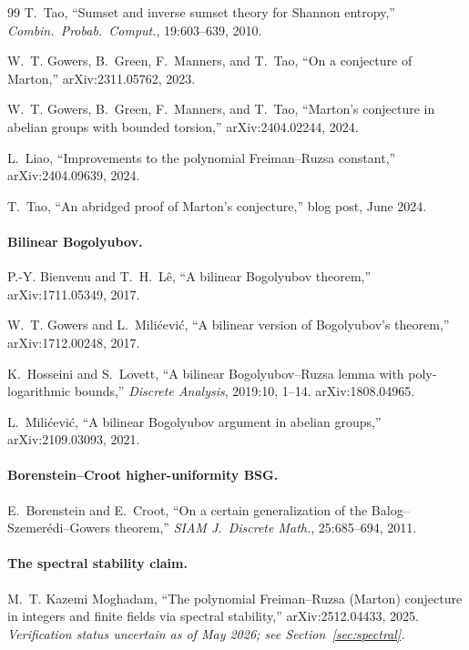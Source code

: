 \documentclass[11pt,a4paper]{article}
\theoremstyle{plain}
\theoremstyle{definition}
\theoremstyle{remark}
\begin{document}
\begin{thebibliography}{99}
T.~Tao, ``Sumset and inverse sumset theory for Shannon entropy,'' \emph{Combin.\ Probab.\ Comput.}, 19:603--639, 2010.

W.~T. Gowers, B.~Green, F.~Manners, and T.~Tao, ``On a conjecture of Marton,'' arXiv:2311.05762, 2023.

W.~T. Gowers, B.~Green, F.~Manners, and T.~Tao, ``Marton's conjecture in abelian groups with bounded torsion,'' arXiv:2404.02244, 2024.

L.~Liao, ``Improvements to the polynomial Freiman--Ruzsa constant,'' arXiv:2404.09639, 2024.

T.~Tao, ``An abridged proof of Marton's conjecture,'' blog post, June 2024.

\paragraph{Bilinear Bogolyubov.}

P.-Y. Bienvenu and T.~H.~L\^e, ``A bilinear Bogolyubov theorem,'' arXiv:1711.05349, 2017.

W.~T. Gowers and L.~Mili\'cevi\'c, ``A bilinear version of Bogolyubov's theorem,'' arXiv:1712.00248, 2017.

K.~Hosseini and S.~Lovett, ``A bilinear Bogolyubov--Ruzsa lemma with poly-logarithmic bounds,'' \emph{Discrete Analysis}, 2019:10, 1--14. arXiv:1808.04965.

L.~Mili\'cevi\'c, ``A bilinear Bogolyubov argument in abelian groups,'' arXiv:2109.03093, 2021.

\paragraph{Borenstein--Croot higher-uniformity BSG.}

E.~Borenstein and E.~Croot, ``On a certain generalization of the Balog--Szemer\'edi--Gowers theorem,'' \emph{SIAM J.\ Discrete Math.}, 25:685--694, 2011.

\paragraph{The spectral stability claim.}

M.~T. Kazemi Moghadam, ``The polynomial Freiman--Ruzsa (Marton) conjecture in integers and finite fields via spectral stability,'' arXiv:2512.04433, 2025. \emph{Verification status uncertain as of May 2026; see Section~\ref{sec:spectral}.}


\end{thebibliography}
\end{document}
